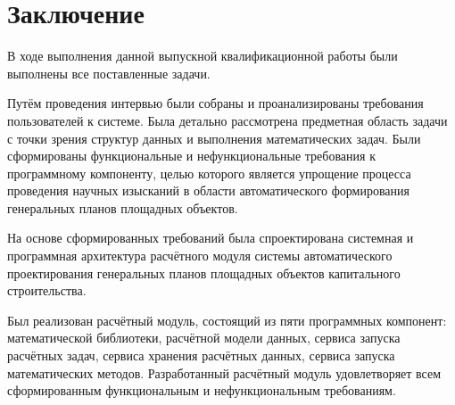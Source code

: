 \section*{\Large{Заключение}}

В ходе выполнения данной выпускной квалификационной работы были выполнены все поставленные задачи.

Путём проведения интервью были собраны и проанализированы требования пользователей к системе.
Была детально рассмотрена предметная область задачи с точки зрения структур данных
и выполнения математических задач.
Были сформированы функциональные и нефункциональные требования к программному компоненту, целью
которого является упрощение процесса проведения научных изысканий
в области автоматического формирования генеральных планов площадных объектов.

На основе сформированных требований была спроектирована системная и программная архитектура
расчётного модуля системы автоматического проектирования генеральных
планов площадных объектов капитального строительства.

Был реализован расчётный модуль, состоящий из пяти программных компонент: математической библиотеки,
расчётной модели данных, сервиса запуска расчётных задач, сервиса хранения расчётных данных,
сервиса запуска математических методов.
Разработанный расчётный модуль удовлетворяет всем сформированным функциональным и нефункциональным требованиям.
